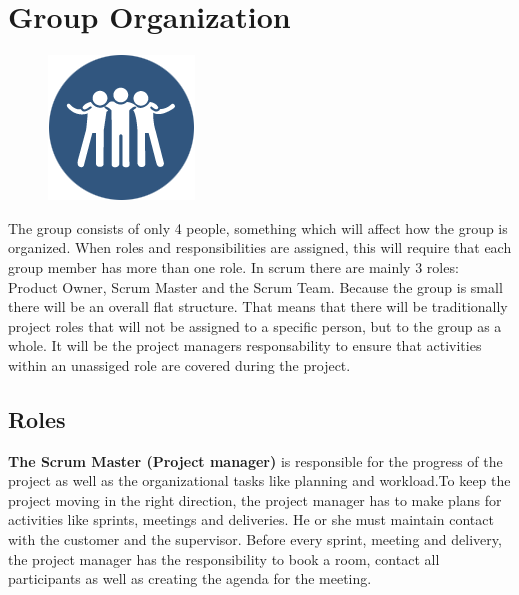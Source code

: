 \clearpage
\section{Group Organization}

\begin{figure}
  \begin{center}
  \includegraphics[scale=0.7]{pictures/team.png}
  \end{center}
\end{figure}

The group consists of only 4 people, something which will affect how the group is organized. When roles and responsibilities are assigned, this will require that each group member has more than one role. In scrum there are mainly 3 roles: Product Owner, Scrum Master and the Scrum Team. Because the group is small there will be an overall flat structure. That means that
there will be traditionally project roles that will not be assigned to a specific person, but to the group as a whole. It will be the project managers responsability to ensure that activities within an unassiged role are covered during the project.

\subsection{Roles}

{\bf The Scrum Master (Project manager)} is responsible for the progress of the project as well as the organizational tasks like planning and workload.To keep the project moving in the right direction, the project manager has to make plans for activities like sprints, meetings and deliveries. He or she must maintain contact with the customer and the supervisor.
Before every sprint, meeting and delivery, the project manager has the responsibility to book a room, contact all
participants as well as creating the agenda for the meeting. \\

